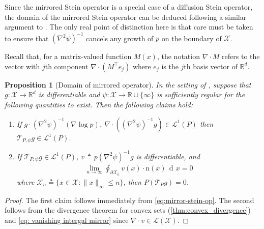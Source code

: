 \documentclass[12pt,paper=letter]{scrreprt}
\newtheorem{proposition}{Proposition}[chapter]
\newcommand{\dee}{\mathop{\mathrm{d}\!}}
\newcommand{\dx}{\,\dee x}
\def\reals{\mathbb{R}} %
\def\defeq{\triangleq} %
\newcommand{\normal}{\mathrm{n}} %
\newcommand{\xset}[0]{\mathcal{X}} %
\newcommand{\TP}{\mathcal{T}_P}
\newcommand{\TPpsi}{\mathcal{T}_{P,\psi}}
\newcommand{\Lp}[1][p]{\mathcal{L}^{#1}}
\begin{document}
Since the mirrored Stein operator is a special case of a diffusion Stein operator, the domain of the mirrored Stein operator can be deduced following a similar argument to   \citep[see also][Prop.~1]{shi2022sampling}.
The only real point of distinction here is that care must be taken to ensure that $(\nabla^2\psi)^{-1}$ cancels any growth of $p$ on the boundary of $\xset$.

Recall that, for a matrix-valued function $M(x)$, the notation $\nabla \cdot M$ refers to the vector with $j$th component $\nabla \cdot (M^\top e_j)$ where $e_j$ is the $j$th basis vector of $\mathbb{R}^d$.



	 
   


\begin{proposition}[Domain of mirrored operator] \label{prop:mirror-stein-identity}
    In the setting of , suppose that  $g : \mathcal{X} \to \reals^d$ is differentiable and $\psi : \xset \rightarrow \reals \cup \{\infty\}$ is sufficiently regular for the following quantities to exist.
    Then the following claims hold:
\begin{enumerate}
\item If $g \cdot (\nabla^2\psi)^{-1} (\nabla \log p)$, $\nabla\cdot ((\nabla^2\psi)^{-1}g)  \in \Lp[1](P)$ then $\TPpsi g \in \Lp[1](P)$.
\item %
If $\TPpsi g \in \Lp[1](P)$, $v\defeq p(\nabla^2\psi)^{-1}g$ is differentiable, and
\begin{align}
\lim_{n \rightarrow \infty} \oint_{\partial \mathcal{X}_n} v(x) \cdot \normal(x) \dx = 0  \label{eq: vanishing intergal mirror}
\end{align}
where $\mathcal{X}_n \defeq  \{x \in \mathcal{X} : \|x\|_\infty \leq n\}$, then $P(\TP g) = 0$.
\end{enumerate}
\end{proposition}
\begin{proof}
    The first claim follows immediately from \cref{eq:mirror-stein-op}.
    The second follows from the divergence theorem for convex sets (\cref{thm:convex_divergence}) and \cref{eq: vanishing intergal mirror} since  $\nabla \cdot v \in \mathcal{L}(\mathcal{X})$. 
\end{proof}
\end{document}
